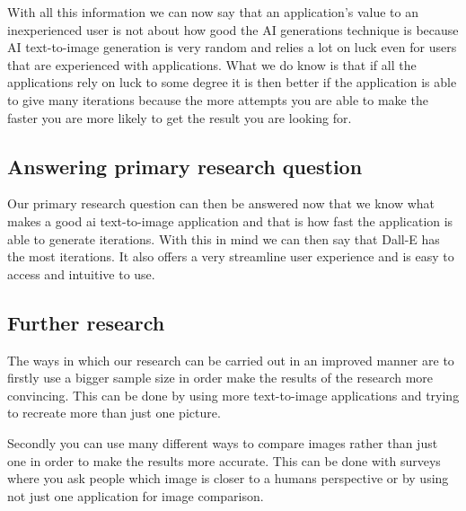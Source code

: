 \documentclass[]{report}
\begin{document}
	
	With all this information we can now say that an application's value to an inexperienced user is not about how good the AI generations technique is because AI text-to-image generation is very random and relies a lot on luck even for users that are experienced with applications. What we do know is that if all the applications rely on luck to some degree it is then better if the application is able to give many iterations because the more attempts you are able to make the faster you are more likely to get the result you are looking for. 
	
	\subsection{Answering primary research question}
	
	Our primary research question can then be answered now that we know what makes a good ai text-to-image application and that is how fast the application is able to generate iterations. With this in mind we can then say that Dall-E has the most iterations. It also offers a very streamline user experience and is easy to access and intuitive to use.
	
	\subsection{Further research}
	
	The ways in which our research can be carried out in an improved manner are to firstly use a bigger sample size in order make the results of the research more convincing. This can be done by using more text-to-image applications and trying to recreate more than just one picture. 
	
	Secondly you can use many different ways to compare images rather than just one in order to make the results more accurate. This can be done with surveys where you ask people which image is closer to a humans perspective or by using not just one application for image comparison.
	
\end{document}
